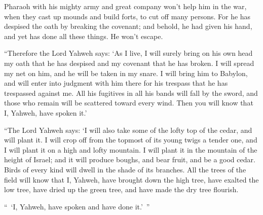 {Pharaoh with his mighty army and great company won’t help him in the war, when they cast up mounds and build forts, to cut off many persons.
For he has despised the oath by breaking the covenant; and behold, he had given his hand, and yet has done all these things. He won’t escape.
\par }{\PP {}“Therefore the Lord Yahweh says: ‘As I live, I will surely bring on his own head my oath that he has despised and my covenant that he has broken.
I will spread my net on him, and he will be taken in my snare. I will bring him to Babylon, and will enter into judgment with him there for his trespass that he has trespassed against me.
All his fugitives in all his bands will fall by the sword, and those who remain will be scattered toward every wind. Then you will know that I, Yahweh, have spoken it.’
\par }{\PP {}“The Lord Yahweh says: ‘I will also take some of the lofty top of the cedar, and will plant it. I will crop off from the topmost of its young twigs a tender one, and I will plant it on a high and lofty mountain.
I will plant it in the mountain of the height of Israel; and it will produce boughs, and bear fruit, and be a good cedar. Birds of every kind will dwell in the shade of its branches.
All the trees of the field will know that I, Yahweh, have brought down the high tree, have exalted the low tree, have dried up the green tree, and have made the dry tree flourish.
\par }{\PP “ ‘I, Yahweh, have spoken and have done it.’ ”

}
